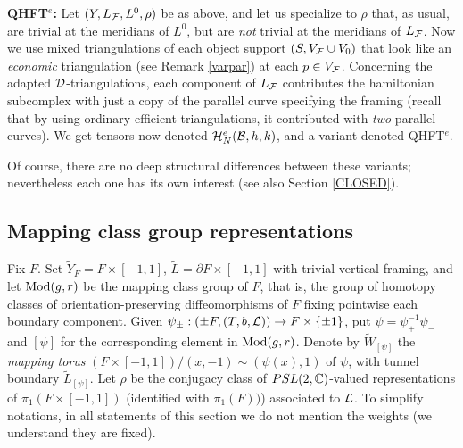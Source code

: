 {\bf QHFT$^e$:} Let $(Y,L_{\mathcal F},L^0,\rho)$ be as above, and let us
specialize to $\rho$ that, as usual, are trivial at the meridians of
$L^0$, but are {\it not} trivial at the meridians of $L_{\mathcal F}$. Now we
use mixed triangulations of each object support $(S,V_{\mathcal F}\cup V_0)$
that look like an {\it economic} triangulation (see Remark
\ref{varpar}) at each $p\in V_{\mathcal F}$. Concerning the adapted
${\mathcal D}$-triangulations, each component of $L_{\mathcal F}$ contributes the
hamiltonian subcomplex with just a copy of the parallel curve
specifying the framing (recall that by using ordinary efficient
triangulations, it contributed with {\it two} parallel curves). We get
tensors now denoted ${\mathcal H}^e_N({\mathcal B},h,k)$, and a variant denoted
QHFT$^e$.
\medskip

Of course, there are no deep structural differences between these
variants; nevertheless each one has its own interest (see also Section
\ref{CLOSED}).

\subsection{Mapping class group representations}\label{MODREP}
Fix $F$. Set $\tilde{Y}_F= F\times [-1,1]$, $\tilde{L}=\partial
F\times [-1,1]$ with trivial vertical framing, and let ${\rm
Mod}(g,r)$ be the mapping class group of $F$, that is, the group of
homotopy classes of orientation-preserving diffeomorphisms of $F$
fixing pointwise each boundary component. Given $\psi_{\pm}:(\pm F,
(T,b,{\mathcal L})) \rightarrow F \times \{\pm 1\}$, put $\psi=
\psi_+^{-1}\psi_-$ and $[\psi]$ for the corresponding element in ${\rm
Mod}(g,r)$. Denote by $\tilde{W}_{[\psi]}$ the {\it mapping torus}
$(F\times [-1,1])/ (x,-1) \sim (\psi(x),1)$ of $\psi$, with tunnel
boundary $\tilde{L}_{[\psi]}$. Let $\rho$ be the conjugacy class of
$PSL(2,{\mathbb C})$-valued representations of $\pi_1(F\times [-1,1])$
(identified with $\pi_1(F))$) associated to ${\mathcal L}$.  To simplify
notations, in all statements of this section we do not mention the
weights (we understand they are fixed).

